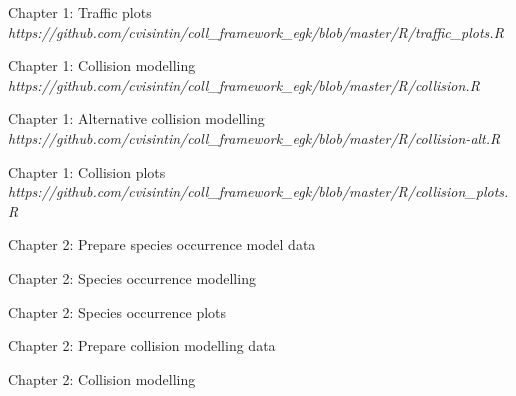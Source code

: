\vspace{.5cm}
\noindent Chapter 1: Traffic plots\\
\textit{https://github.com/cvisintin/coll\_framework\_egk/blob/master/R/traffic\_plots.R}
%

\vspace{.5cm}
\noindent Chapter 1: Collision modelling\\
\textit{https://github.com/cvisintin/coll\_framework\_egk/blob/master/R/collision.R}
%

\vspace{.5cm}
\noindent Chapter 1: Alternative collision modelling\\
\textit{https://github.com/cvisintin/coll\_framework\_egk/blob/master/R/collision-alt.R}
%

\vspace{.5cm}
\noindent Chapter 1: Collision plots\\
\textit{https://github.com/cvisintin/coll\_framework\_egk/blob/master/R/collision\_plots.R}
%


\vspace{.5cm}
\noindent Chapter 2: Prepare species occurrence model data

%

\vspace{.5cm}
\noindent Chapter 2: Species occurrence modelling

%

\vspace{.5cm}
\noindent Chapter 2: Species occurrence plots

%

\vspace{.5cm}
\noindent Chapter 2: Prepare collision modelling data

%

\vspace{.5cm}
\noindent Chapter 2: Collision modelling

